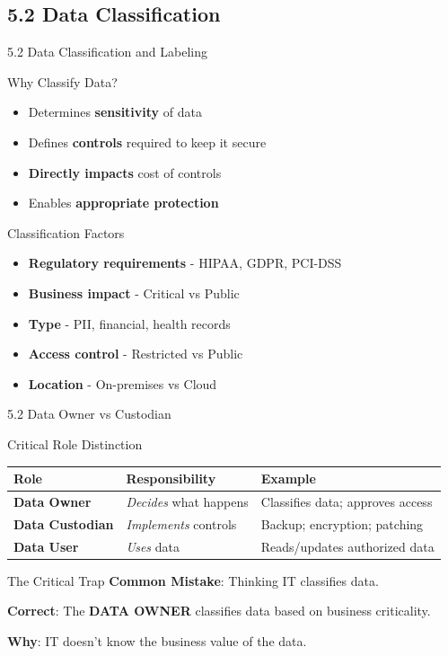 \documentclass[10pt]{beamer}  %
\begin{document}
	\subsection{5.2 Data Classification}
	\begin{frame}{5.2 Data Classification and Labeling}
		\begin{block}{Why Classify Data?}
			\begin{itemize}
				\item Determines \textbf{sensitivity} of data
				\item Defines \textbf{controls} required to keep it secure
				\item \textbf{Directly impacts} cost of controls
				\item Enables \textbf{appropriate protection}
			\end{itemize}
		\end{block}
		
		\begin{block}{Classification Factors}
			\begin{itemize}
				\item \textbf{Regulatory requirements} - HIPAA, GDPR, PCI-DSS
				\item \textbf{Business impact} - Critical vs Public
				\item \textbf{Type} - PII, financial, health records
				\item \textbf{Access control} - Restricted vs Public
				\item \textbf{Location} - On-premises vs Cloud
			\end{itemize}
		\end{block}
	\end{frame}
	
	\begin{frame}{5.2 Data Owner vs Custodian}
		\begin{block}{Critical Role Distinction}
			\begin{tabular}{|p{2.5cm}|p{4cm}|p{4.5cm}|}
				\hline
				\textbf{Role} & \textbf{Responsibility} & \textbf{Example} \\
				\hline
				\textbf{Data Owner} & \textit{Decides} what happens & Classifies data; approves access \\
				\hline
				\textbf{Data Custodian} & \textit{Implements} controls & Backup; encryption; patching \\
				\hline
				\textbf{Data User} & \textit{Uses} data & Reads/updates authorized data \\
				\hline
			\end{tabular}
		\end{block}
		
		\begin{alertblock}{The Critical Trap}
			\textbf{Common Mistake}: Thinking IT classifies data.
			
			\textbf{Correct}: The \textbf{DATA OWNER} classifies data based on business criticality.
			
			\textbf{Why}: IT doesn't know the business value of the data.
		\end{alertblock}
	\end{frame}
	
\end{document}
